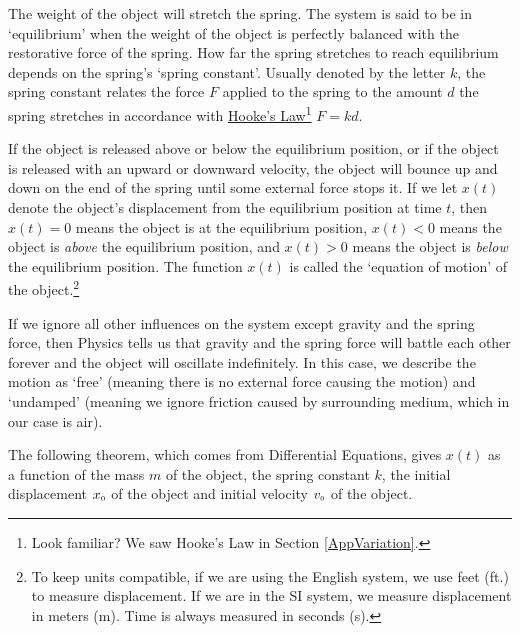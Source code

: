 The weight of the object will stretch the spring.   The system is said to be in `equilibrium' when the weight of the object is perfectly balanced with the restorative force of the spring.  How far the spring stretches to reach equilibrium depends on the spring's `spring constant'. Usually denoted by the letter $k$, the spring constant relates the force $F$ applied to the spring to the amount $d$ the spring stretches in accordance with \href{http://en.wikipedia.org/wiki/Hooke's_law}{\underline{Hooke's Law}}\footnote{Look familiar?  We saw Hooke's Law in Section \ref{AppVariation}.} $F = kd$.  

\smallskip

If the object is released above or below the equilibrium position, or if the object is released with an upward or downward velocity, the object will bounce up and down on the end of the spring until some external force stops it.  If we let $x(t)$ denote the object's displacement from the equilibrium position at time $t$, then $x(t) = 0$ means the object is at the equilibrium position, $x(t) < 0$ means the object is \textit{above} the equilibrium position, and $x(t) > 0$ means the object is \textit{below} the equilibrium position.  The function $x(t)$ is called the `equation of motion' of the object.\footnote{To keep units compatible, if we are using the English system, we use feet (ft.) to measure displacement.  If we are in the SI system, we measure displacement in meters (m). Time is always measured in seconds (s).}

\smallskip


If we ignore all other influences on the system except gravity and the spring force, then Physics tells us that gravity and the spring force will battle each other forever and the object will oscillate indefinitely.  In this case, we describe the motion as `free' (meaning there is no external force causing the motion) and `undamped' (meaning we ignore friction caused by surrounding medium, which in our case is air).  

\smallskip

The following theorem, which comes from Differential Equations, gives $x(t)$ as a function of the mass $m$ of the object, the spring constant $k$, the initial displacement $x_{\text{\tiny $0$}}$ of the object and initial velocity $v_{\text{\tiny $0$}}$ of the object.  

\smallskip

